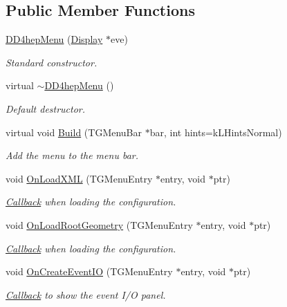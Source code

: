 \subsection*{Public Member Functions}
\begin{DoxyCompactItemize}
\item 
\hyperlink{class_d_d4hep_1_1_d_d4hep_menu_a3d62c983630ad5f2d7f31fbe8c3d3e3e}{D\+D4hep\+Menu} (\hyperlink{class_d_d4hep_1_1_display}{Display} $\ast$eve)
\begin{DoxyCompactList}\small\item\em Standard constructor. \end{DoxyCompactList}\item 
virtual \hyperlink{class_d_d4hep_1_1_d_d4hep_menu_ab6c197b60017a053af2d1d41e63574f2}{$\sim$\+D\+D4hep\+Menu} ()
\begin{DoxyCompactList}\small\item\em Default destructor. \end{DoxyCompactList}\item 
virtual void \hyperlink{class_d_d4hep_1_1_d_d4hep_menu_a85d08c3fd89b740586c592797e780607}{Build} (T\+G\+Menu\+Bar $\ast$bar, int hints=k\+L\+Hints\+Normal)
\begin{DoxyCompactList}\small\item\em Add the menu to the menu bar. \end{DoxyCompactList}\item 
void \hyperlink{class_d_d4hep_1_1_d_d4hep_menu_a3bb55c2f200a4575cf4bddd720efd5ab}{On\+Load\+X\+ML} (T\+G\+Menu\+Entry $\ast$entry, void $\ast$ptr)
\begin{DoxyCompactList}\small\item\em \hyperlink{class_d_d4hep_1_1_callback}{Callback} when loading the configuration. \end{DoxyCompactList}\item 
void \hyperlink{class_d_d4hep_1_1_d_d4hep_menu_a4bc97ab3803f51bf9d271dd88781d6be}{On\+Load\+Root\+Geometry} (T\+G\+Menu\+Entry $\ast$entry, void $\ast$ptr)
\begin{DoxyCompactList}\small\item\em \hyperlink{class_d_d4hep_1_1_callback}{Callback} when loading the configuration. \end{DoxyCompactList}\item 
void \hyperlink{class_d_d4hep_1_1_d_d4hep_menu_a560b5e3a05e4d3ef571fa876ac1dcdd2}{On\+Create\+Event\+IO} (T\+G\+Menu\+Entry $\ast$entry, void $\ast$ptr)
\begin{DoxyCompactList}\small\item\em \hyperlink{class_d_d4hep_1_1_callback}{Callback} to show the event I/O panel. \end{DoxyCompactList}\item 

\end{DoxyCompactItemize}
